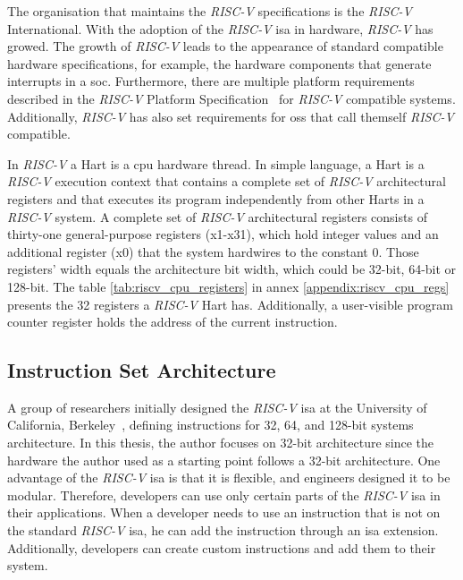 The organisation that maintains the \textit{RISC-V} specifications is the \textit{RISC-V} International. With the adoption of the \textit{RISC-V} \acrlong{isa} in hardware, \textit{RISC-V} has growed. The growth of \textit{RISC-V} leads to the appearance of standard compatible hardware specifications, for example, the hardware components that generate interrupts in a \acrshort{soc}. Furthermore, there are multiple platform requirements described in the \textit{RISC-V} Platform Specification~\cite{riscv_platform_specification} for \textit{RISC-V} compatible systems. Additionally, \textit{RISC-V} has also set requirements for \acrshort{os}s that call themself \textit{RISC-V} compatible.

In \textit{RISC-V} a Hart is a \acrshort{cpu} hardware thread. In simple language, a Hart is a \textit{RISC-V} execution context that contains a complete set of \textit{RISC-V} architectural registers and that executes its program independently from other Harts in a \textit{RISC-V} system. A complete set of \textit{RISC-V} architectural registers consists of thirty-one general-purpose registers (x1-x31), which hold integer values and an additional register (x0) that the system hardwires to the constant 0. Those registers' width equals the architecture bit width, which could be 32-bit, 64-bit or 128-bit. The table \ref{tab:riscv_cpu_registers} in annex \ref{appendix:riscv_cpu_regs} presents the 32 registers a \textit{RISC-V} Hart has. Additionally, a user-visible program counter register holds the address of the current instruction.

\subsection{Instruction Set Architecture}
\label{subsection:isa}
A group of researchers initially designed the \textit{RISC-V} \acrshort{isa} at the University of California, Berkeley~\cite{asanovic2014instruction}, defining instructions for 32, 64, and 128-bit systems architecture. In this thesis, the author focuses on 32-bit architecture since the hardware the author used as a starting point follows a 32-bit architecture. One advantage of the \textit{RISC-V} \acrshort{isa} is that it is flexible, and engineers designed it to be modular. Therefore, developers can use only certain parts of the \textit{RISC-V} \acrshort{isa} in their applications. When a developer needs to use an instruction that is not on the standard \textit{RISC-V} \acrshort{isa}, he can add the instruction through an \acrshort{isa} extension. Additionally, developers can create custom instructions and add them to their system.

